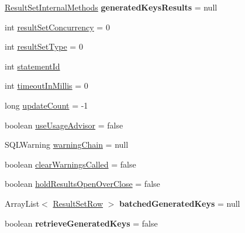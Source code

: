 \begin{DoxyCompactItemize}
\mbox{\hyperlink{interfacecom_1_1mysql_1_1jdbc_1_1_result_set_internal_methods}{Result\+Set\+Internal\+Methods}} {\bfseries generated\+Keys\+Results} = null
\item 
int \mbox{\hyperlink{classcom_1_1mysql_1_1jdbc_1_1_statement_impl_aca243fcfce2d3a1be8a97d643b83ddc3}{result\+Set\+Concurrency}} = 0
\item 
int \mbox{\hyperlink{classcom_1_1mysql_1_1jdbc_1_1_statement_impl_a9c4013da0e1b73577723769660e4ff25}{result\+Set\+Type}} = 0
\item 
int \mbox{\hyperlink{classcom_1_1mysql_1_1jdbc_1_1_statement_impl_aeefafb17757195a6bdffb9bc7afd25d2}{statement\+Id}}
\item 
int \mbox{\hyperlink{classcom_1_1mysql_1_1jdbc_1_1_statement_impl_a6fb9299b3b831a067d0b4e3c7ebf7525}{timeout\+In\+Millis}} = 0
\item 
long \mbox{\hyperlink{classcom_1_1mysql_1_1jdbc_1_1_statement_impl_ac02cb20e3888ccc6f695bccb8a87b141}{update\+Count}} = -\/1
\item 
boolean \mbox{\hyperlink{classcom_1_1mysql_1_1jdbc_1_1_statement_impl_a1b1dbd4c597f5286ad18d8b0337bf851}{use\+Usage\+Advisor}} = false
\item 
S\+Q\+L\+Warning \mbox{\hyperlink{classcom_1_1mysql_1_1jdbc_1_1_statement_impl_a9e37a58ec76d5d660fff09e917422489}{warning\+Chain}} = null
\item 
boolean \mbox{\hyperlink{classcom_1_1mysql_1_1jdbc_1_1_statement_impl_a3a8b121394054e7b2cae506f761c130a}{clear\+Warnings\+Called}} = false
\item 
boolean \mbox{\hyperlink{classcom_1_1mysql_1_1jdbc_1_1_statement_impl_adb96342ca6273a9abdc79673a890fd74}{hold\+Results\+Open\+Over\+Close}} = false
\item 
\mbox{\label{classcom_1_1mysql_1_1jdbc_1_1_statement_impl_a3f3ac0d1c9ffd929d657e881e79fb431}} 
Array\+List$<$ \mbox{\hyperlink{classcom_1_1mysql_1_1jdbc_1_1_result_set_row}{Result\+Set\+Row}} $>$ {\bfseries batched\+Generated\+Keys} = null
\item 
\mbox{\label{classcom_1_1mysql_1_1jdbc_1_1_statement_impl_ae7a4e13472f84067653f69bce6a139f6}} 
boolean {\bfseries retrieve\+Generated\+Keys} = false
\item 
\mbox{\label{classcom_1_1mysql_1_1jdbc_1_1_statement_impl_a93dd60dfa1cd326cacff2668fcf0b342}} 

\end{DoxyCompactItemize}
